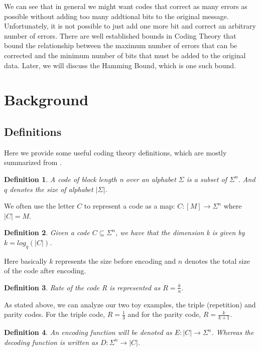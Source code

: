 \documentclass{article}
\newtheorem{Definition}{Definition}
\begin{document}
We can see that in general we might want codes that correct as many errors as possible without adding too many addtional bits to the original message. Unfortunately, it is not possible to just add one more bit and correct an arbitrary number of errors. There are well established bounds in Coding Theory that bound the relationship between the maximum number of errors that can be corrected and the minimum number of bits that must be added to the original data. Later, we will discuss the Hamming Bound, which is one such bound. 


\section{Background}
\subsection{Definitions}

\noindent Here we provide some useful coding theory definitions, which are mostly summarized from \cite{book}.

\begin{Definition}
A code of block length n over an alphabet $\Sigma$ is a subset of $\Sigma ^n$. And $q$ denotes the size of alphabet $|\Sigma|$. \cite{book}
\end{Definition}
\noindent We often use the letter $C$ to represent a code as a map: $C: [M] \rightarrow \Sigma^n$ where $|C| = M$.

\begin{Definition}
Given a code $C \subseteq \Sigma^n$, we have that the dimension k is given by $k = log_q(|C|)$.
\end{Definition}
\noindent Here basically $k$ represents the size before encoding and $n$ denotes the total size of the code after encoding. 
\begin{Definition}
Rate of the code R is represented as $R=\frac{k}{n}$.
\end{Definition}
\noindent As stated above, we can analyze our two toy examples, the triple (repetition) and parity codes.  For the triple code, $R=\frac{1}{3}$ and for the parity code, $R = \frac{k}{k+1}$.
\begin{Definition}
An encoding function will be denoted as $E:|C| \rightarrow \Sigma^n$. Whereas the decoding function is written as $D:\Sigma^n \rightarrow |C|$.
\end{Definition}
\end{document}
